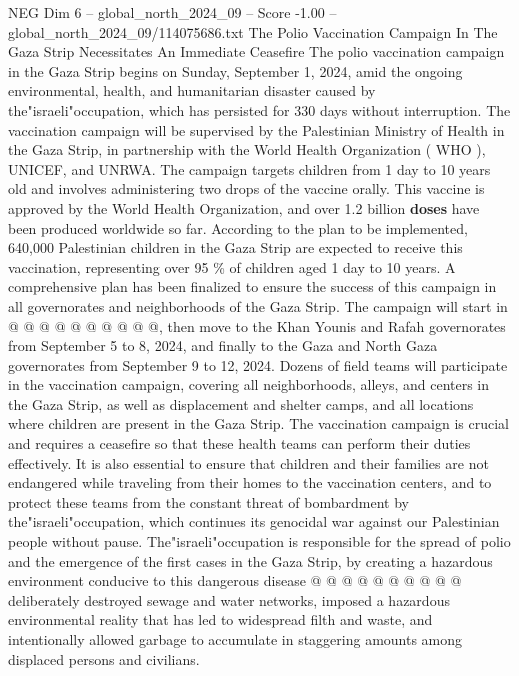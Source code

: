 \begin{textsample}{NEG Dim 6 – global\_north\_2024\_09 – Score -1.00 – global\_north\_2024\_09/114075686.txt}  \label{ex:f6_neg_025}
The Polio Vaccination Campaign In The Gaza Strip Necessitates An Immediate Ceasefire The polio vaccination campaign in the Gaza Strip begins on Sunday, September 1, 2024, amid the ongoing environmental, health, and humanitarian disaster caused by the"israeli"occupation, which has persisted for 330 days without interruption.
The vaccination campaign will be supervised by the Palestinian Ministry of Health in the Gaza Strip, in partnership with the World Health Organization ( WHO ), UNICEF, and UNRWA.
The campaign targets children from 1 day to 10 years old and involves administering two drops of the vaccine orally.
This vaccine is approved by the World Health Organization, and over 1.2 billion \textbf{doses} have been produced worldwide so far.
According to the plan to be implemented, 640,000 Palestinian children in the Gaza Strip are expected to receive this vaccination, representing over 95 \% of children aged 1 day to 10 years.
A comprehensive plan has been finalized to ensure the success of this campaign in all governorates and neighborhoods of the Gaza Strip.
The campaign will start in @ @ @ @ @ @ @ @ @ @, then move to the Khan Younis and Rafah governorates from September 5 to 8, 2024, and finally to the Gaza and North Gaza governorates from September 9 to 12, 2024.
Dozens of field teams will participate in the vaccination campaign, covering all neighborhoods, alleys, and centers in the Gaza Strip, as well as displacement and shelter camps, and all locations where children are present in the Gaza Strip.
The vaccination campaign is crucial and requires a ceasefire so that these health teams can perform their duties effectively.
It is also essential to ensure that children and their families are not endangered while traveling from their homes to the vaccination centers, and to protect these teams from the constant threat of bombardment by the"israeli"occupation, which continues its genocidal war against our Palestinian people without pause.
The"israeli"occupation is responsible for the spread of polio and the emergence of the first cases in the Gaza Strip, by creating a hazardous environment conducive to this dangerous disease @ @ @ @ @ @ @ @ @ @ deliberately destroyed sewage and water networks, imposed a hazardous environmental reality that has led to widespread filth and waste, and intentionally allowed garbage to accumulate in staggering amounts among displaced persons and civilians.

\end{textsample}

